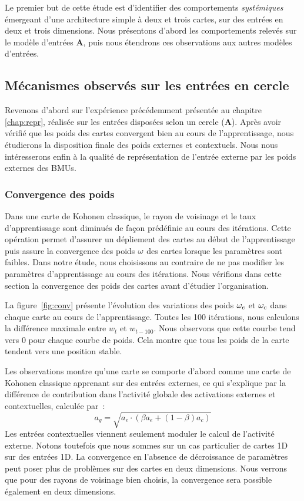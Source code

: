 \documentclass[../main]{subfiles}
\begin{document}
Le premier but de cette étude est d'identifier des comportements \emph{systémiques} émergeant d'une architecture simple à deux et trois cartes, sur des entrées en deux et trois dimensions. 
Nous présentons d'abord les comportements relevés sur le modèle d'entrées \textbf{A}, puis nous étendrons ces observations aux autres modèles d'entrées.

\subsection{Mécanismes observés sur les entrées en cercle}

Revenons d'abord sur l'expérience précédemment présentée au chapitre \ref{chap:repr}, réalisée sur les entrées disposées selon un cercle (\textbf{A}).
Après avoir vérifié que les poids des cartes convergent bien au cours de l'apprentissage, nous étudierons la disposition finale des poids externes et contextuels.
Nous nous intéresserons enfin à la qualité de représentation de l'entrée externe par les poids externes des BMUs.

\subsubsection{Convergence des poids}

Dans une carte de Kohonen classique, le rayon de voisinage et le taux d'apprentissage sont diminués de façon prédéfinie au cours des itérations. 
Cette opération permet d'assurer un dépliement des cartes au début de l'apprentissage puis assure la convergence des poids $\omega$ des cartes lorsque les paramètres sont faibles.
Dans notre étude, nous choisissons au contraire de ne pas modifier les paramètres d'apprentissage au cours des itérations.
Nous vérifions dans cette section la convergence des poids des cartes avant d'étudier l'organisation. 

La figure~\ref{fig:conv} présente l'évolution des variations des poids $\omega_{e}$ et $\omega_{c}$ dans chaque carte au cours de l'apprentissage. Toutes les 100 itérations, nous calculons la différence maximale entre $w_t$ et $w_{t-100}$.
Nous observons que cette courbe tend vers $0$ pour chaque courbe de poids. Cela montre que tous les poids de la carte tendent vers une position stable.

Les observations montre qu'une carte se comporte d'abord comme une carte de Kohonen classique apprenant sur des entrées externes, ce qui s'explique par la différence de contribution dans l'activité globale des activations externes et contextuelles, calculée par~: 
$$ a_g = \sqrt{a_e \cdot (\beta a_e + (1-\beta)a_c)}$$
Les entrées contextuelles viennent seulement moduler le calcul de l'activité externe.
Notons toutefois que nous sommes sur un cas particulier de cartes 1D sur des entrées 1D.
La convergence en l'absence de décroissance de paramètres peut poser plus de problèmes sur des cartes en deux dimensions. 
Nous verrons que pour des rayons de voisinage bien choisis, la convergence sera possible également en deux dimensions.
\end{document}

